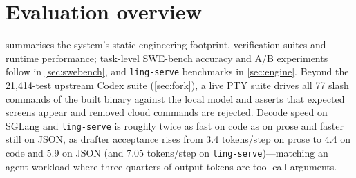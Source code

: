 \documentclass[11pt]{article}
\newcommand{\code}[1]{\texttt{#1}}
\begin{document}
\section{Evaluation overview}
\label{sec:eval}

 summarises the system's static engineering footprint, verification suites and
runtime performance; task-level SWE-bench accuracy and A/B experiments follow in
\cref{sec:swebench}, and \code{ling-serve} benchmarks in \cref{sec:engine}. Beyond the 21{,}414-test
upstream Codex suite (\cref{sec:fork}), a live PTY suite drives all 77 slash commands of the
built binary against the local model and asserts that expected screens appear and removed cloud
commands are rejected. Decode speed on SGLang and \code{ling-serve} is roughly twice as fast on
code as on prose and faster still on JSON, as drafter acceptance rises from 3.4 tokens/step on
prose to 4.4 on code and 5.9 on JSON (and 7.05 tokens/step on \code{ling-serve})—matching an agent
workload where three quarters of output tokens are tool-call arguments.
\end{document}
